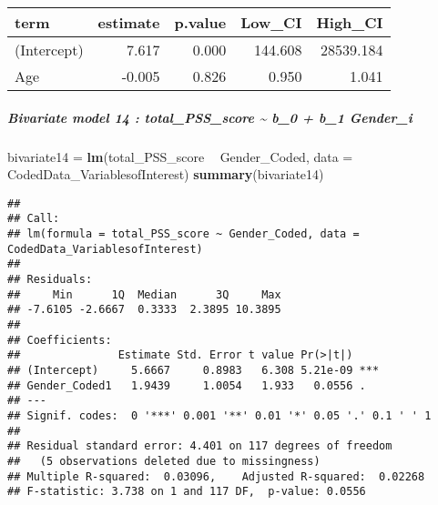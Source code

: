 \documentclass[]{article}
\newenvironment{Shaded}{\begin{snugshade}}{\end{snugshade}}
\newcommand{\DataTypeTok}[1]{\textcolor[rgb]{0.13,0.29,0.53}{#1}}
\newcommand{\DecValTok}[1]{\textcolor[rgb]{0.00,0.00,0.81}{#1}}
\newcommand{\FloatTok}[1]{\textcolor[rgb]{0.00,0.00,0.81}{#1}}
\newcommand{\KeywordTok}[1]{\textcolor[rgb]{0.13,0.29,0.53}{\textbf{#1}}}
\newcommand{\NormalTok}[1]{#1}
\newcommand{\OperatorTok}[1]{\textcolor[rgb]{0.81,0.36,0.00}{\textbf{#1}}}
\newcommand{\StringTok}[1]{\textcolor[rgb]{0.31,0.60,0.02}{#1}}
\let\oldsubparagraph\subparagraph
\renewcommand{\subparagraph}[1]{\oldsubparagraph{#1}\mbox{}}
\begin{document}
\begin{Shaded}
\end{Shaded}

\begin{longtable}[]{@{}lrrrr@{}}
\toprule
term & estimate & p.value & Low\_CI & High\_CI\tabularnewline
\midrule
\endhead
(Intercept) & 7.617 & 0.000 & 144.608 & 28539.184\tabularnewline
Age & -0.005 & 0.826 & 0.950 & 1.041\tabularnewline
\bottomrule
\end{longtable}

\hypertarget{bivariate-model-14-total_pss_score-b_0-b_1-gender_i}{%
\subparagraph{Bivariate model 14 : total\_PSS\_score \textasciitilde{}
b\_0 + b\_1
Gender\_i}\label{bivariate-model-14-total_pss_score-b_0-b_1-gender_i}}

\begin{Shaded}
\begin{Highlighting}[]
\NormalTok{bivariate14 =}\StringTok{ }\KeywordTok{lm}\NormalTok{(total_PSS_score }\OperatorTok{~}\StringTok{ }\NormalTok{Gender_Coded, }\DataTypeTok{data =}\NormalTok{ CodedData_VariablesofInterest)}
\KeywordTok{summary}\NormalTok{(bivariate14)}
\end{Highlighting}
\end{Shaded}

\begin{verbatim}
## 
## Call:
## lm(formula = total_PSS_score ~ Gender_Coded, data = CodedData_VariablesofInterest)
## 
## Residuals:
##     Min      1Q  Median      3Q     Max 
## -7.6105 -2.6667  0.3333  2.3895 10.3895 
## 
## Coefficients:
##               Estimate Std. Error t value Pr(>|t|)    
## (Intercept)     5.6667     0.8983   6.308 5.21e-09 ***
## Gender_Coded1   1.9439     1.0054   1.933   0.0556 .  
## ---
## Signif. codes:  0 '***' 0.001 '**' 0.01 '*' 0.05 '.' 0.1 ' ' 1
## 
## Residual standard error: 4.401 on 117 degrees of freedom
##   (5 observations deleted due to missingness)
## Multiple R-squared:  0.03096,    Adjusted R-squared:  0.02268 
## F-statistic: 3.738 on 1 and 117 DF,  p-value: 0.0556
\end{verbatim}
\end{document}
